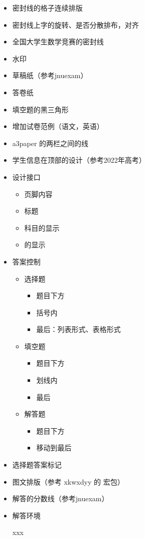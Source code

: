 \documentclass{ccnudoc}
\begin{document}
\begin{itemize}
  \item 密封线的格子连续排版
  \item 密封线上字的旋转、是否分散排布，对齐
  \item 全国大学生数学竞赛的密封线
  \item 水印
  \item 草稿纸（参考jnuexam）
  \item 答卷纸
  \item 填空题的黑三角形
  \item 增加试卷范例（语文，英语）
  \item a3paper 的两栏之间的线
    \begin{latexcode}[gobble = 6]
      \setlength{\columnseprule}{0.4pt}
    \end{latexcode}
  \item 学生信息在顶部的设计（参考2022年高考）
  \item 设计接口
    \begin{itemize}
      \item 页脚内容
      \item 标题
      \item 科目的显示
      \item {} 的显示
    \end{itemize}
  \item 答案控制
    \begin{itemize}
      \item 选择题
        \begin{itemize}
          \item 题目下方
          \item 括号内
          \item 最后：列表形式、表格形式
        \end{itemize}
      \item 填空题
        \begin{itemize}
          \item 题目下方
          \item 划线内
          \item 最后
        \end{itemize}
      \item 解答题
        \begin{itemize}
          \item 题目下方
          \item 移动到最后
        \end{itemize}
    \end{itemize}
  \item 选择题答案标记
  \item 图文排版（参考 xkwxdyy 的  宏包）
  \item 解答的分数线（参考jnuexam）
  \item 解答环境
    \begin{latexcode}[gobble = 6]
      \begin{solution}
        xxx
      \end{solution}


\end{latexcode}
\end{itemize}
\end{document}
